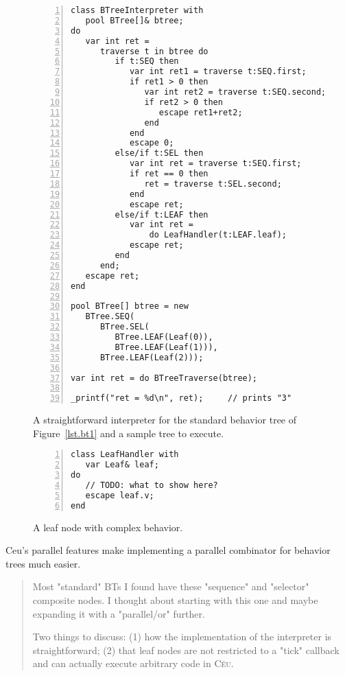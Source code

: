 \documentclass{acm_proc_article-sp}
\newcommand{\CEU}{\textsc{C\'{e}u}\xspace}
\begin{document}
\begin{figure}%
\begin{lstlisting}[numbers=left,xleftmargin=3em]
class BTreeInterpreter with
   pool BTree[]& btree;
do
   var int ret =
      traverse t in btree do
         if t:SEQ then
            var int ret1 = traverse t:SEQ.first;
            if ret1 > 0 then
               var int ret2 = traverse t:SEQ.second;
               if ret2 > 0 then
                  escape ret1+ret2;
               end
            end
            escape 0;
         else/if t:SEL then
            var int ret = traverse t:SEQ.first;
            if ret == 0 then
               ret = traverse t:SEL.second;
            end
            escape ret;
         else/if t:LEAF then
            var int ret =
                do LeafHandler(t:LEAF.leaf);
            escape ret;
         end
      end;
   escape ret;
end

pool BTree[] btree = new
   BTree.SEQ(
      BTree.SEL(
         BTree.LEAF(Leaf(0)),
         BTree.LEAF(Leaf(1))),
      BTree.LEAF(Leaf(2)));

var int ret = do BTreeTraverse(btree);

_printf("ret = %d\n", ret);     // prints "3"
\end{lstlisting}
\caption{ A straightforward interpreter for the standard behavior tree of 
          Figure~\ref{lst.bt1} and a sample tree to execute.
\label{lst.bt1.interpreter}
}
\end{figure}

\begin{figure}%
\begin{lstlisting}[numbers=left,xleftmargin=3em]
class LeafHandler with
   var Leaf& leaf;
do
   // TODO: what to show here?
   escape leaf.v;
end
\end{lstlisting}
\caption{ A leaf node with complex behavior.
\label{lst.bt1.leaf}
}
\end{figure}


Ceu's parallel features make implementing a parallel combinator for behavior 
trees much easier.

\begin{quotation}
Most "standard" BTs I found have these "sequence" and "selector" composite 
nodes.
I thought about starting with this one and maybe expanding it with a 
"parallel/or" further.

Two things to discuss:
(1) how the implementation of the interpreter is straightforward;
(2) that leaf nodes are not restricted to a "tick" callback and can actually 
execute arbitrary code in \CEU.
\end{quotation}
\end{document}
